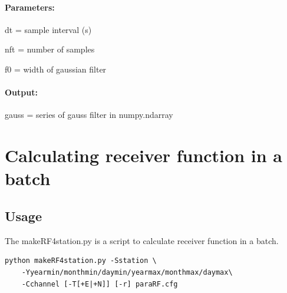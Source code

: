 \documentclass[12pt, a4paper]{report}
\begin{document}
\paragraph{Parameters:}
\begin{description}
\item dt = sample interval (s)
\item nft = number of samples
\item f0 = width of gaussian filter
\end{description}
\paragraph{Output:}
\begin{description}
\item gauss = series of gauss filter in {\C numpy.ndarray}
\end{description}

\section{Calculating receiver function in a batch}
\subsection{Usage}
The {\C makeRF4station.py} is a script to calculate receiver function in a batch.
\begin{lstlisting}
python makeRF4station.py -Sstation \
	-Yyearmin/monthmin/daymin/yearmax/monthmax/daymax\
	-Cchannel [-T[+E|+N]] [-r] paraRF.cfg
\end{lstlisting}
\end{document}
